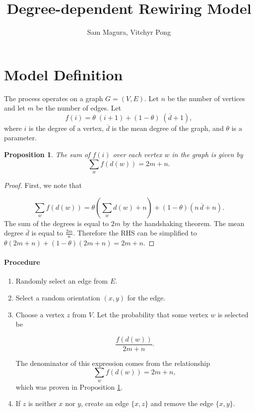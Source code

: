 \documentclass[a4paper,10pt]{article}
\title{Degree-dependent Rewiring Model}
\author{Sam Magura, Vitchyr Pong}
\newtheorem{prop}{Proposition}
\begin{document}
\maketitle

\section{Model Definition}
The process operates on a graph $G = (V, E)$. Let $n$ be the number of vertices and let $m$ be the number of edges. Let
 \begin{equation}
f(i) = \theta \; (i + 1) + (1-\theta) \; (\overline{d} + 1),
\end{equation}
where $i$ is the degree of a vertex, $\overline{d}$ is the mean degree of the graph, and $\theta$ is a parameter.

\begin{prop}\label{prop:sum}
The sum of $f(i)$ over each vertex $w$ in the graph is given by
\begin{equation}
 \sum\limits_{w} f(d(w)) = 2m + n. 
 \end{equation}
\end{prop}
\begin{proof}
First, we note that

\begin{equation}
 \sum\limits_{w} f(d(w)) = \theta \left(\sum\limits_{w} d(w) + n\right) + (1-\theta)(n \,\overline{d} + n). 
 \end{equation}
 The sum of the degrees is equal to $2m$ by the handshaking theorem. The mean degree $\overline{d}$ is equal to $\frac{2m}{n}$. Therefore the RHS can be simplified to $\theta \left(2m + n\right) + (1-\theta)(2m + n) = 2m + n.$ 
\end{proof}

\paragraph{Procedure}
\begin{enumerate}
 \item Randomly select an edge from $E$.
 \item Select a random orientation $(x, y)$ for the edge.
 \item \label{item:z} Choose a vertex $z$ from $V$. Let the probability that some vertex $w$ is selected be
 
 \begin{equation}
 \label{eqn:pr}\frac{f(d(w))}{2m + n}.
 \end{equation} 

The denominator of this expression comes from the relationship
\begin{equation*}
 \sum\limits_{w} f(d(w)) = 2m + n, 
 \end{equation*}
which was proven in Proposition \ref{prop:sum}.

\item If $z$ is neither $x$ nor $y$, create an edge $\{x, z\}$ and remove the edge $\{x, y\}$.
\end{enumerate}
\end{document}
